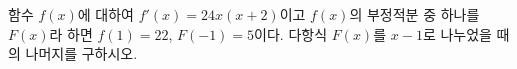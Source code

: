 함수 $f(x)$에 대하여 $f'(x)=24x(x+2)$이고 $f(x)$의 부정적분 중 하나를 $F(x)$라 하면 $f(1)=22$, $F(-1)=5$이다. 다항식 $F(x)$를 $x-1$로 나누었을 때의 나머지를 구하시오.
